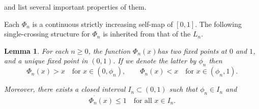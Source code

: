 \documentclass[onecolumn]{article}
\newtheorem{lemma}[theorem]{Lemma}
\begin{document}
and list several important properties of them.

Each $\Phi _{n}$ is a continuous strictly increasing self-map of $[0,1]$.
The following single-crossing structure for $\Phi _{n}$ is inherited from
that of the $L_{n}$.

\begin{lemma}
\label{Phi} \bigskip For each $n\geq 0$, the function $\Phi _{n}(x)$has two
fixed points at $0$ and $1$, and a unique fixed point in $(0,1)$. If we
denote the latter by $\phi _{n}$ then%
\begin{equation}
\Phi _{n}(x)>x\quad \text{for }x\in (0,\phi _{n}),\qquad \Phi _{n}(x)<x\quad 
\text{for }x\in (\phi _{n},1).  \label{172a1}
\end{equation}

Moreover, there exists a closed interval $I_{n}\subset (0,1)$ such that $%
\phi _{n}\in I_{n}$ and \ \ \ 
\begin{equation}
\Phi _{n}^{^{\prime }}(x)\leq 1\quad \text{for all }x\in I_{n}.
\label{172a2}
\end{equation}
\end{lemma}
\end{document}
